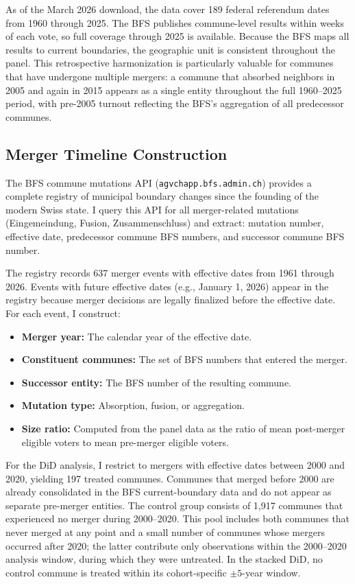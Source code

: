 \documentclass[12pt]{article}
\begin{document}
As of the March 2026 download, the data cover 189 federal referendum dates from 1960 through 2025. The BFS publishes commune-level results within weeks of each vote, so full coverage through 2025 is available. Because the BFS maps all results to current boundaries, the geographic unit is consistent throughout the panel. This retrospective harmonization is particularly valuable for communes that have undergone multiple mergers: a commune that absorbed neighbors in 2005 and again in 2015 appears as a single entity throughout the full 1960--2025 period, with pre-2005 turnout reflecting the BFS's aggregation of all predecessor communes.

\subsection{Merger Timeline Construction}

The BFS commune mutations API (\texttt{agvchapp.bfs.admin.ch}) provides a complete registry of municipal boundary changes since the founding of the modern Swiss state. I query this API for all merger-related mutations (Eingemeindung, Fusion, Zusammenschluss) and extract: mutation number, effective date, predecessor commune BFS numbers, and successor commune BFS number.

The registry records 637 merger events with effective dates from 1961 through 2026. Events with future effective dates (e.g., January 1, 2026) appear in the registry because merger decisions are legally finalized before the effective date. For each event, I construct:

\begin{itemize}
    \item \textbf{Merger year:} The calendar year of the effective date.
    \item \textbf{Constituent communes:} The set of BFS numbers that entered the merger.
    \item \textbf{Successor entity:} The BFS number of the resulting commune.
    \item \textbf{Mutation type:} Absorption, fusion, or aggregation.
    \item \textbf{Size ratio:} Computed from the panel data as the ratio of mean post-merger eligible voters to mean pre-merger eligible voters.
\end{itemize}

For the DiD analysis, I restrict to mergers with effective dates between 2000 and 2020, yielding 197 treated communes. Communes that merged before 2000 are already consolidated in the BFS current-boundary data and do not appear as separate pre-merger entities. The control group consists of 1,917 communes that experienced no merger during 2000--2020. This pool includes both communes that never merged at any point and a small number of communes whose mergers occurred after 2020; the latter contribute only observations within the 2000--2020 analysis window, during which they were untreated. In the stacked DiD, no control commune is treated within its cohort-specific $\pm 5$-year window.
\end{document}
